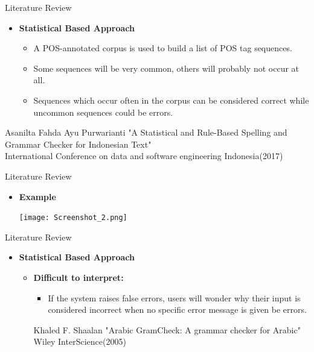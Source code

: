 \documentclass{beamer}
\begin{document}
\begin{frame}{Literature Review}
\begin{itemize}
	\item \textbf{Statistical Based Approach} \\
	\vspace{1em}
	\begin{itemize}
		\item A POS-annotated corpus is used to build a list of POS tag sequences.\\
		\vspace{0.8em}
		\item Some sequences will be very common, others will probably not occur at all. \\
		\vspace{0.8em}
		\item Sequences which occur	often in the corpus can be considered correct while uncommon sequences could be errors. 
	\end{itemize}
\end{itemize}
	\vspace{4em}
	\footnotesize \color{blue}Asanilta Fahda Ayu Purwarianti 
	\color{black} {"A Statistical and Rule-Based Spelling and Grammar Checker for Indonesian Text"}\\
	\color{blue} International Conference on data and software engineering Indonesia(2017)
\end{frame}


\begin{frame}{Literature Review}
	\begin{itemize}
		\item \textbf{Example}
\begin{center}
	\texttt{[image: Screenshot\_2.png]}	
\end{center}
\vspace{3em}
\end{itemize}
\end{frame}



\begin{frame}{Literature Review}
\begin{itemize}
\item \textbf{Statistical Based Approach} \\
\vspace{0.5em}
\begin{itemize}
	\item \textbf{Difficult to interpret:} 
	\vspace{1em}
	\begin{itemize}
		\item If the system raises false errors, users will wonder why their input is considered incorrect when no specific error message is given be errors. 
	\end{itemize}
	\vspace{5em}
\footnotesize \color{blue}Khaled F. Shaalan
\color{black} {"Arabic GramCheck:	A grammar checker for Arabic"} \\
\color{blue} Wiley InterScience(2005)	
\end{itemize}
\end{itemize}
\end{frame}
\end{document}
